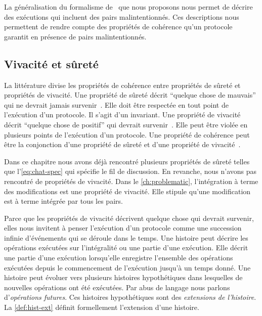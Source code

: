 
La généralisation du formalisme de~\textcite{burckhardt_eventualconsistency_2014} que nous proposons nous permet de décrire des exécutions qui incluent des pairs malintentionnés.
Ces descriptions nous permettent de rendre compte des propriétés de cohérence qu'un protocole garantit en présence de pairs malintentionnés.

\subsection{Vivacité et sûreté}\label{subsec:consistency-spec-liveness-safety}

La littérature divise les propriétés de cohérence entre propriétés de sûreté et propriétés de vivacité.
Une propriété de sûreté décrit \enquote{quelque chose de mauvais} qui ne devrait jamais survenir~\autocite{lamport_1977_correctness}.
Elle doit être respectée en tout point de l'exécution d'un protocole.
Il s'agit d'un invariant.
Une propriété de vivacité décrit \enquote{quelque chose de positif} qui devrait survenir~\autocite{lamport_1977_correctness}.
Elle peut être violée en plusieurs points de l'exécution d'un protocole.
Une propriété de cohérence peut être la conjonction d'une propriété de sûreté et d'une propriété de vivacité~\autocite{alpern_liveness_1985}.

Dans ce chapitre nous avons déjà rencontré plusieurs propriétés de sûreté telles que l'\autoref{eq:chat-spec} qui spécifie le fil de discussion.
En revanche, nous n'avons pas rencontré de propriétés de vivacité.
Dans le \autoref{ch:problematic}, l'intégration à terme des modifications est une propriété de vivacité.
Elle stipule qu'une modification est à terme intégrée par tous les pairs.

Parce que les propriétés de vivacité décrivent quelque chose qui devrait survenir, elles nous invitent à penser l'exécution d'un protocole comme une succession infinie d'événements qui se déroule dans le temps.
Une histoire peut décrire les opérations exécutées sur l'intégralité ou une partie d'une exécution.
Elle décrit une partie d'une exécution lorsqu'elle enregistre l'ensemble des opérations exécutées depuis le commencement de l'exécution jusqu'à un temps donné.
Une histoire peut évoluer vers plusieurs histoires hypothétiques dans lesquelles de nouvelles opérations ont été exécutées.
Par abus de langage nous parlons d'\emph{opérations futures}.
Ces histoires hypothétiques sont des \emph{extensions de l'histoire}.
La \autoref{def:hist-ext} définit formellement l'extension d'une histoire.

